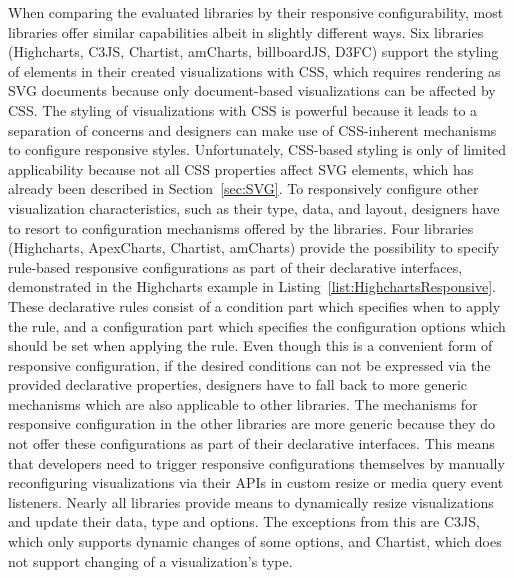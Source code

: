 When comparing the evaluated libraries by their responsive
configurability, most libraries offer similar capabilities albeit in
slightly different ways.  Six libraries (Highcharts, C3JS, Chartist,
amCharts, billboardJS, D3FC) support the styling of elements in their
created visualizations with CSS, which requires rendering as SVG
documents because only document-based visualizations can be affected
by CSS.  The styling of visualizations with CSS is powerful because it
leads to a separation of concerns and designers can make use of
CSS-inherent mechanisms to configure responsive styles.
Unfortunately, CSS-based styling is only of limited applicability
because not all CSS properties affect SVG elements, which has already
been described in Section~\ref{sec:SVG}.  To responsively configure
other visualization characteristics, such as their type, data, and
layout, designers have to resort to configuration mechanisms offered
by the libraries.  Four libraries (Highcharts, ApexCharts, Chartist,
amCharts) provide the possibility to specify rule-based responsive
configurations as part of their declarative interfaces, demonstrated
in the Highcharts example in Listing~\ref{list:HighchartsResponsive}.
These declarative rules consist of a condition part which specifies
when to apply the rule, and a configuration part which specifies the
configuration options which should be set when applying the rule.
Even though this is a convenient form of responsive configuration, if
the desired conditions can not be expressed via the provided
declarative properties, designers have to fall back to more generic
mechanisms which are also applicable to other libraries.  The
mechanisms for responsive configuration in the other libraries are
more generic because they do not offer these configurations as part of
their declarative interfaces.  This means that developers need to
trigger responsive configurations themselves by manually reconfiguring
visualizations via their APIs in custom resize or media query event
listeners.  Nearly all libraries provide means to dynamically resize
visualizations and update their data, type and options.  The
exceptions from this are C3JS, which only supports dynamic changes of
some options, and Chartist, which does not support changing of a
visualization's type.



\begin{samepage}
 
    This example demonstrates how responsive rules can be declared to configure various aspects of a visualization in relation to the size of the viewport.
  },
]{listings/highcharts-responsive.js}
\end{samepage}


